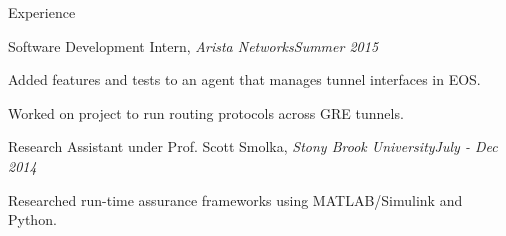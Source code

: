 \documentclass{resume} %
\begin{document}
\begin{rSection}{Experience}

\begin{rSubsection}{Software Development Intern, {\em Arista Networks}}{\em Summer 2015}{}{}
\item Added features and tests to an agent that manages tunnel interfaces in EOS.
\item Worked on project to run routing protocols across GRE tunnels.
\end{rSubsection}

\begin{rSubsection}{Research Assistant under Prof. Scott Smolka, {\em Stony Brook University}}{\em July - Dec 2014}{}{}
\item Researched run-time assurance frameworks using MATLAB/Simulink and Python.
\end{rSubsection}

\end{rSection}
\end{document}
